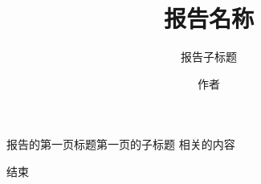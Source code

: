 \documentclass[t]{beamer}
\title{报告名称}
\subtitle{报告子标题}
\institute{西安交通大学\ 软件学院 }
\author{作者}
\begin{document}
	\maketitle
	\begin{frame}{报告的第一页标题}{第一页的子标题}
		相关的内容
	\end{frame}
\begin{frame}[c]{结束}
\end{frame}
\end{document}
